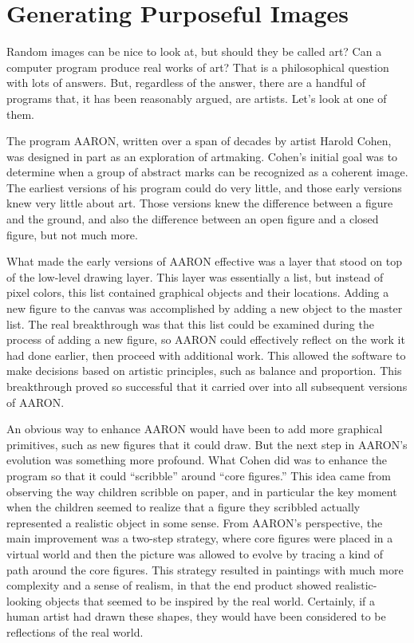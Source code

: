 \section{Generating Purposeful Images}

Random images can be nice to look at, but should they be called art?
Can a computer program produce real works of art?
That is a philosophical question with lots of answers.
But, regardless of the answer,
there are a handful of programs that, it has been reasonably argued,
are artists. Let's look at one of them.

The program AARON,
written over a span of decades by artist Harold Cohen,
was designed in part as an exploration of artmaking. Cohen's
initial goal was to determine when a group of abstract marks can
be recognized as a coherent image. The earliest versions of his program
could do very little, and those early versions knew very little about art.
Those versions knew the difference between a figure and the ground, and also
the difference between an open figure and a closed figure, but
not much more.

What made the early versions of AARON effective was a layer that
stood on top of the low-level drawing layer. This layer was essentially
a list, but instead of pixel colors, this list contained graphical objects
and their locations. Adding a new figure to the canvas was accomplished
by adding a new object to the master list. The real breakthrough was
that this list could be examined during the process of adding
a new figure, so AARON could effectively reflect on the work it had
done earlier, then proceed with additional work.
This allowed the software to make decisions based on
artistic principles, such as balance and proportion.
This breakthrough proved so successful
that it carried over into all subsequent versions of AARON.

An obvious way to enhance AARON would have been to add more graphical
primitives, such as new figures that it could draw. But
the next step in AARON's evolution was something more profound. What
Cohen did was to enhance the program so that it could ``scribble'' around
``core figures.'' This idea came from observing the way children
scribble on paper, and in particular the key moment when the children
seemed to realize that a figure they scribbled actually represented a
realistic object in some sense. From AARON's perspective, the main improvement
was a two-step strategy, where core figures
were placed in a virtual world
and then the picture was allowed to evolve by tracing a kind of path
around the core figures.
This strategy resulted in paintings with much more complexity
and a sense of realism, in that the end product showed realistic-looking
objects that seemed to be inspired by the real world. Certainly, if a
human artist had drawn these shapes, they would have been considered to be
reflections of the real world.

